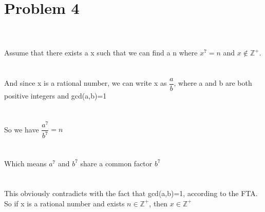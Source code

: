 \documentclass{article}
\begin{document}
\section{Problem 4}
\\ \hspace*{\fill} \\
Assume that there exists a x such that we can find a n where $x^7=n$ and $x\notin \mathbb{Z}^+$.\\
\\ \hspace*{\fill} \\
And since x is a rational number, we can write x as $\dfrac{a}{b}$, where a and b are both positive integers and gcd(a,b)=1\\
\\ \hspace*{\fill} \\
So we have $\dfrac{a^7}{b^7}=n$\\
\\ \hspace*{\fill} \\
Which means $a^7$ and $b^7$ share a common factor $b^7$\\
\\ \hspace*{\fill} \\
This obviously contradicts with the fact that gcd(a,b)=1, according to the FTA. So if x is a rational number and exists $n \in \mathbb{Z}^+$, then $x \in \mathbb{Z}^+$\\
\\ \hspace*{\fill} \\
\end{document}
